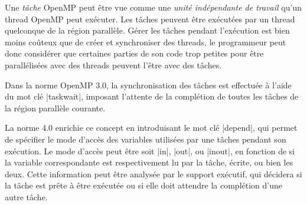 \documentclass[parallelisme]{compas2016}
\begin{document}
Une \emph{tâche} OpenMP peut être vue comme une \emph{unité indépendante de travail} qu'un thread
OpenMP peut exécuter. Les tâches peuvent être exécutées par un thread quelconque
de la région parallèle.
Gérer les tâches pendant l'exécution est bien moins coûteux que de créer et synchroniser
des threads, le programmeur peut donc considérer que certaines parties de son code
trop petites pour être parallélisées avec des threads peuvent l'être avec des tâches.

Dans la norme OpenMP 3.0, la synchronisation des tâches est effectuée à l'aide du
mot clé |taskwait|, imposant l'attente de la complétion de toutes les tâches
de la région parallèle courante.

La norme 4.0 enrichie ce concept en introduisant le mot clé |depend|, qui permet
de spécifier le mode d'accès des variables utilisées par une tâches pendant son exécution.
Le mode d'accès peut être soit |in|, |out|, ou |inout|, en fonction de si la
variable correspondante est respectivement lu par la tâche, écrite, ou bien les deux.
Cette information peut être analysée par le support exécutif, qui décidera si
la tâche est prête à être exécutée ou si elle doit attendre la complétion d'une
autre tâche.




\end{document}
